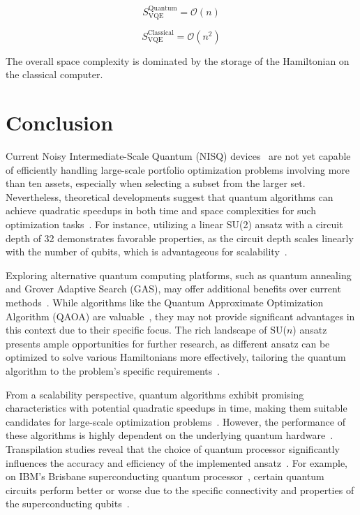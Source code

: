 \documentclass[%
 reprint,
 amsmath,amssymb,
 aps,
]{revtex4-2}
\begin{document}
\begin{equation} S_{\text{VQE}}^{\text{Quantum}} = \mathcal{O}(n) \end{equation}

\begin{equation} S_{\text{VQE}}^{\text{Classical}} = \mathcal{O}(n^2) \end{equation}

The overall space complexity is dominated by the storage of the Hamiltonian on the classical computer.

\section{Conclusion}

Current Noisy Intermediate-Scale Quantum (NISQ) devices~\cite{Preskill2018} are not yet capable of efficiently handling large-scale portfolio optimization problems involving more than ten assets, especially when selecting a subset from the larger set. Nevertheless, theoretical developments suggest that quantum algorithms can achieve quadratic speedups in both time and space complexities for such optimization tasks~\cite{Harrow2009}. For instance, utilizing a linear SU(2) ansatz with a circuit depth of 32 demonstrates favorable properties, as the circuit depth scales linearly with the number of qubits, which is advantageous for scalability~\cite{Kandala2017}.

Exploring alternative quantum computing platforms, such as quantum annealing and Grover Adaptive Search (GAS), may offer additional benefits over current methods~\cite{Farhi2000,Grover1996}. While algorithms like the Quantum Approximate Optimization Algorithm (QAOA) are valuable~\cite{Farhi2014}, they may not provide significant advantages in this context due to their specific focus. The rich landscape of SU($n$) ansatz presents ample opportunities for further research, as different ansatz can be optimized to solve various Hamiltonians more effectively, tailoring the quantum algorithm to the problem's specific requirements~\cite{Cerezo2021}.

From a scalability perspective, quantum algorithms exhibit promising characteristics with potential quadratic speedups in time, making them suitable candidates for large-scale optimization problems~\cite{Shor1997}. However, the performance of these algorithms is highly dependent on the underlying quantum hardware~\cite{Devitt2016}. Transpilation studies reveal that the choice of quantum processor significantly influences the accuracy and efficiency of the implemented ansatz~\cite{Tannu2019}. For example, on IBM's Brisbane superconducting quantum processor~\cite{IBMQBrisbane}, certain quantum circuits perform better or worse due to the specific connectivity and properties of the superconducting qubits~\cite{Krinner2019}.
\end{document}
